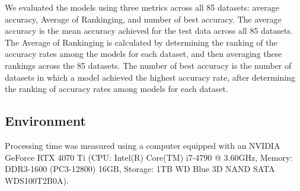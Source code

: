\documentclass[conference]{IEEEtran}
\begin{document}
We evaluated the models using three metrics across all 85 datasets: average
accuracy, Average of Rankinging, and number of best accuracy. The average accuracy
is the mean accuracy achieved for the test data across all 85 datasets. The
Average of Rankinging is calculated by determining the ranking of the accuracy rates
among the models for each dataset, and then averaging these rankings across
the 85 datasets. The number of best accuracy is the number of datasets in which
a model achieved the highest accuracy rate, after determining the ranking of
accuracy rates among models for each dataset. 

\subsection{Environment}
Processing time was measured using a computer equipped with an NVIDIA GeForce RTX 4070 Ti (CPU: Intel(R) Core(TM) i7-4790 @ 3.60GHz, Memory: DDR3-1600 (PC3-12800) 16GB, Storage: 1TB WD Blue 3D NAND SATA WDS100T2B0A).

\end{document}
